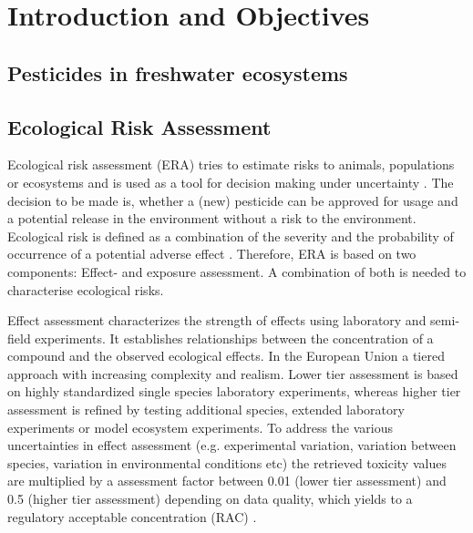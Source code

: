 \chapter{Introduction and Objectives}
\label{sec:introduction} 

\section{Pesticides in freshwater ecosystems}



\section{Ecological Risk Assessment}
Ecological risk assessment (ERA) tries to estimate risks to animals, populations or ecosystems and is used as a tool for decision making under uncertainty \citep{newman_fundamentals_2015}. 
The decision to be made is, whether a (new) pesticide can be approved for usage and a potential release in the environment without a risk to the environment. 
Ecological risk is defined as a combination of the severity and the probability of occurrence of a potential adverse effect \citep{suter_ecological_2007}. 
Therefore, ERA is based on two components: Effect- and exposure assessment.
A combination of both is needed to characterise ecological risks.

Effect assessment characterizes the strength of effects using laboratory and semi-field experiments.
It establishes relationships between the concentration of a compound and the observed ecological effects.
In the European Union a tiered approach with increasing complexity and realism.
Lower tier assessment is based on highly standardized single species laboratory experiments, whereas higher tier assessment is refined by testing additional species, extended laboratory experiments or model ecosystem experiments. 
To address the various uncertainties in effect assessment (e.g. experimental variation, variation between species, variation in environmental conditions etc) the retrieved toxicity values are multiplied by a assessment factor between 0.01 (lower tier assessment) and 0.5 (higher tier assessment) depending on data quality, which yields to a regulatory acceptable concentration (RAC) \citep{efsa_guidance_2013}. 

